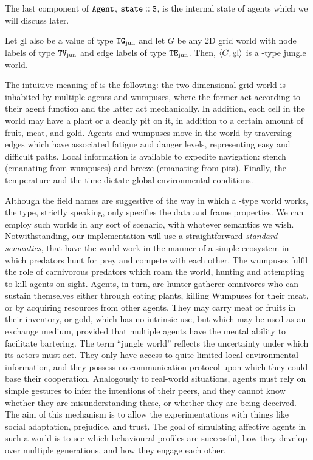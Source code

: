 \begin{definition}[\wjun]
The last component of $\mathtt{Agent}$, $\mathtt{state} :: \mathtt{S}$, is the internal state of agents which we will discuss later.

Let $\mathrm{gl}$ also be a value of type $\mathtt{TG}_{\mathrm{jun}}$ and let $G$ be any 2D grid world with node labels of type $\mathtt{TV}_{\mathrm{jun}}$ and edge labels of type $\mathtt{TE}_{\mathrm{jun}}$. Then, $\langle G, \mathrm{gl} \rangle$ is a \wjun-type jungle world.
\end{definition}

The intuitive meaning of \wjun is the following: the two-dimensional grid world is inhabited by multiple agents and wumpuses, where the former act according to their agent function and the latter act mechanically. In addition, each cell in the world may have a plant or a deadly pit on it, in addition to a certain amount of fruit, meat, and gold. Agents and wumpuses move in the world by traversing edges which have associated fatigue and danger levels, representing easy and difficult paths. Local information is available to expedite navigation: stench (emanating from wumpuses) and breeze (emanating from pits). Finally, the temperature and the time dictate global environmental conditions.

Although the field names are suggestive of the way in which a \wjun-type world works, the type, strictly speaking, only specifies the data and frame properties. We can employ such worlds in any sort of scenario, with whatever semantics we wish. Notwithstanding, our implementation will use a straightforward {\em standard semantics}, that have the world work in the manner of a simple ecosystem in which predators hunt for prey and compete with each other. The wumpuses fulfil the role of carnivorous predators which roam the world, hunting and attempting to kill agents on sight. Agents, in turn, are hunter-gatherer omnivores who can sustain themselves either through eating plants, killing Wumpuses for their meat, or by acquiring resources from other agents. They may carry meat or fruits in their inventory, or gold, which has no intrinsic use, but which may be used as an exchange medium, provided that multiple agents have the mental ability to facilitate bartering. The term ``jungle world'' reflects the uncertainty under which its actors must act. They only have access to quite limited local environmental information, and they possess no communication protocol upon which they could base their cooperation. Analogously to real-world situations, agents must rely on simple gestures to infer the intentions of their peers, and they cannot know whether they are misunderstanding these, or whether they are being deceived. The aim of this mechanism is to allow the experimentations with things like social adaptation, prejudice, and trust. The goal of simulating affective agents in such a world is to see which behavioural profiles are successful, how they develop over multiple generations, and how they engage each other.

